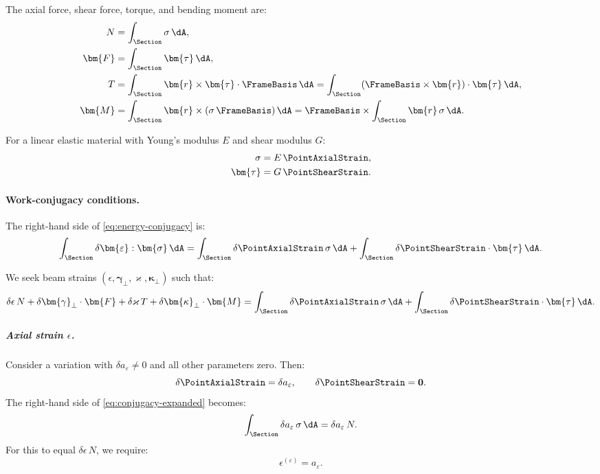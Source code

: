 The axial force, shear force, torque, and bending moment are:
\begin{align*}
N &= \int_\Section \sigma \, \dA, \\
\bm{F} &= \int_\Section \bm{\tau} \, \dA, \\
T &= \int_\Section \bm{r} \times \bm{\tau} \cdot \FrameBasis \, \dA 
= \int_\Section (\FrameBasis \times \bm{r}) \cdot \bm{\tau} \, \dA, \\
\bm{M} &= \int_\Section \bm{r} \times (\sigma\,\FrameBasis) \, \dA 
= \FrameBasis \times \int_\Section \bm{r}\,\sigma \, \dA.
\end{align*}

For a linear elastic material with Young's modulus $E$ and shear modulus $G$:
\begin{align}
\sigma &= E\,\PointAxialStrain, \\
\bm{\tau} &= G\,\PointShearStrain.
\end{align}

\paragraph{Work-conjugacy conditions.}

The right-hand side of \eqref{eq:energy-conjugacy} is:
\begin{equation}
\int_\Section \delta\bm{\varepsilon} : \bm{\sigma} \, \dA 
= \int_\Section \delta\PointAxialStrain\,\sigma \, \dA 
+ \int_\Section \delta\PointShearStrain \cdot \bm{\tau} \, \dA.
\label{eq:rhs-energy}
\end{equation}

We seek beam strains $(\epsilon, \bm{\gamma}_\perp, \varkappa, \bm{\kappa}_\perp)$ 
such that:
\begin{equation}
\delta\epsilon\,N + \delta\bm{\gamma}_\perp \cdot \bm{F} 
+ \delta\varkappa\,T + \delta\bm{\kappa}_\perp \cdot \bm{M} 
= \int_\Section \delta\PointAxialStrain\,\sigma \, \dA 
+ \int_\Section \delta\PointShearStrain \cdot \bm{\tau} \, \dA.
\label{eq:conjugacy-expanded}
\end{equation}

\subparagraph{Axial strain $\epsilon$.}

Consider a variation with $\delta a_\varepsilon \neq 0$ and all other parameters zero. Then:
\begin{equation*}
\delta\PointAxialStrain = \delta a_\varepsilon, \qquad \delta\PointShearStrain = \mathbf{0}.
\end{equation*}
The right-hand side of \eqref{eq:conjugacy-expanded} becomes:
\begin{equation*}
\int_\Section \delta a_\varepsilon\,\sigma \, \dA = \delta a_\varepsilon\,N.
\end{equation*}
For this to equal $\delta\epsilon\,N$, we require:
\begin{equation*}
\epsilon^{(\varepsilon)} = a_\varepsilon.
\end{equation*}

